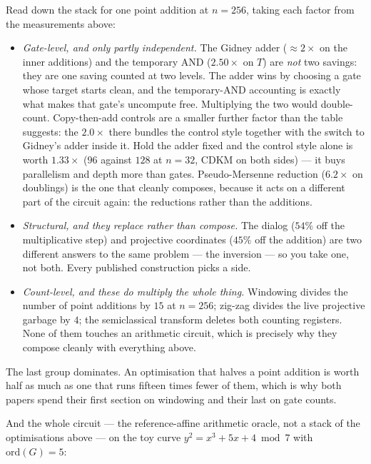 \documentclass[11pt]{article}
\theoremstyle{plain}
\theoremstyle{remark}
\begin{document}
\begin{keybox}[title={How the savings compose --- and where they do not}]
Read down the stack for one point addition at $n=256$, taking each factor from the measurements
above:
\begin{itemize}\setlength\itemsep{2pt}
\item \emph{Gate-level, and only partly independent.} The Gidney adder ($\approx2\times$ on the
inner additions) and the temporary AND ($2.50\times$ on $T$) are \emph{not} two savings:
they are one saving counted at two levels. The adder wins by choosing a gate whose target starts
clean, and the temporary-AND accounting is exactly what makes that gate's uncompute free.
Multiplying the two would double-count. Copy-then-add controls are a smaller further factor than
the table suggests: the $2.0\times$ there bundles the control style together with the
switch to Gidney's adder inside it. Hold the adder fixed and the control style alone is worth
$1.33\times$ ($96$ against $128$ at $n=32$, CDKM on both sides) --- it
buys parallelism and depth more than gates. Pseudo-Mersenne reduction
($6.2\times$ on doublings) is the one that cleanly composes, because it acts on a
different part of the circuit again: the reductions rather than the additions.
\item \emph{Structural, and they replace rather than compose.} The dialog
($54\%$ off the multiplicative step) and projective coordinates
($45\%$ off the addition) are two different answers to the same problem --- the
inversion --- so you take one, not both. Every published construction picks a side.
\item \emph{Count-level, and these do multiply the whole thing.} Windowing divides the number of
point additions by $15$ at $n=256$; zig-zag divides the live projective garbage by
$4$; the semiclassical transform deletes both counting registers. None of them touches an
arithmetic circuit, which is precisely why they compose cleanly with everything above.
\end{itemize}
The last group dominates. An optimisation that halves a point addition is worth half as much as one
that runs fifteen times fewer of them, which is why both papers spend their first section on
windowing and their last on gate counts.
\end{keybox}

\noindent
And the whole circuit --- the reference-affine arithmetic oracle, not a stack of the optimisations
above --- on the toy curve $y^2=x^3+5x+4 \bmod 7$ with $\mathrm{ord}(G)=5$:
\end{document}
